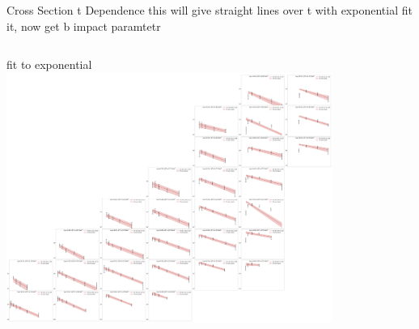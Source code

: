 \documentclass[aspectratio=169]{beamer}
\begin{document}
\begin{frame}{Cross Section t Dependence}
    this will give straight lines over t with exponential
    fit it, now get b impact paramtetr
    \begin{columns}
    
            fit to exponential
        \includegraphics[width=0.8\textwidth]{defense/phi_fitting/full_t_dep.png}
            
    \end{columns}
\end{frame}
\end{document}
